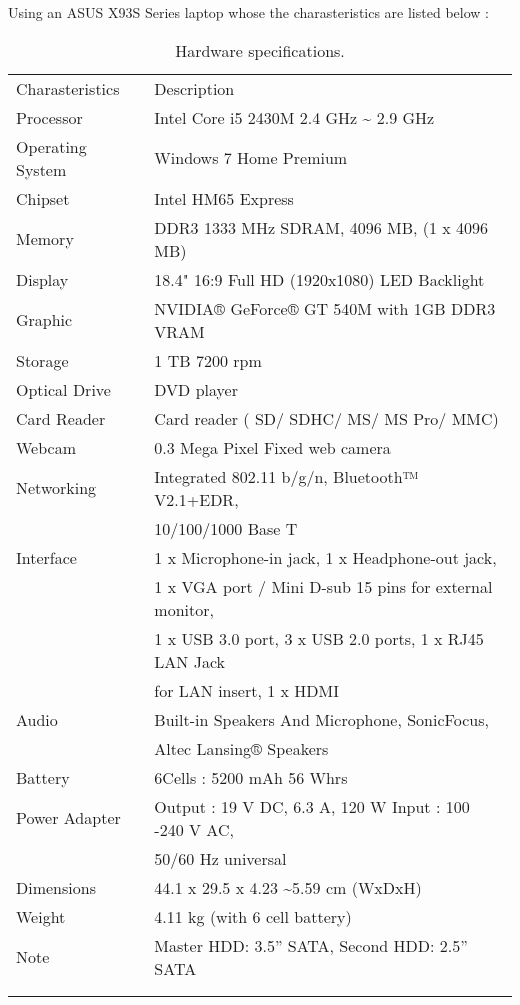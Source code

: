 \documentclass[]{article}
\begin{document}
Using an ASUS X93S Series laptop whose the charasteristics are listed
below :

\begin{longtable}[c]{@{}ll@{}}
\toprule\addlinespace
Charasteristics & Description
\\\addlinespace
\midrule\endhead
Processor & Intel Core i5 2430M 2.4 GHz \textasciitilde{} 2.9 GHz
\\\addlinespace
Operating System & Windows 7 Home Premium
\\\addlinespace
Chipset & Intel HM65 Express
\\\addlinespace
Memory & DDR3 1333 MHz SDRAM, 4096 MB, (1 x 4096 MB)
\\\addlinespace
Display & 18.4" 16:9 Full HD (1920x1080) LED Backlight
\\\addlinespace
Graphic & NVIDIA® GeForce® GT 540M with 1GB DDR3 VRAM
\\\addlinespace
Storage & 1 TB 7200 rpm
\\\addlinespace
Optical Drive & DVD player
\\\addlinespace
Card Reader & Card reader ( SD/ SDHC/ MS/ MS Pro/ MMC)
\\\addlinespace
Webcam & 0.3 Mega Pixel Fixed web camera
\\\addlinespace
Networking & Integrated 802.11 b/g/n, Bluetooth™ V2.1+EDR,
\\\addlinespace
&10/100/1000 Base T
\\\addlinespace
Interface & 1 x Microphone-in jack, 1 x Headphone-out jack,
\\\addlinespace
&
1 x VGA port
/ Mini D-sub 15 pins for external monitor,
\\\addlinespace
&  1 x USB 3.0 port, 3 x USB 2.0
ports, 1 x RJ45 LAN Jack
\\\addlinespace
& for LAN insert, 1 x HDMI
\\\addlinespace
Audio & Built-in Speakers And Microphone, SonicFocus,
\\\addlinespace
& Altec Lansing® Speakers
\\\addlinespace
Battery & 6Cells : 5200 mAh 56 Whrs
\\\addlinespace
Power Adapter & Output : 19 V DC, 6.3 A, 120 W Input : 100 -240 V AC,
\\\addlinespace
& 50/60 Hz universal
\\\addlinespace
Dimensions & 44.1 x 29.5 x 4.23 \textasciitilde{}5.59 cm (WxDxH)
\\\addlinespace
Weight & 4.11 kg (with 6 cell battery)
\\\addlinespace
Note & Master HDD: 3.5'' SATA, Second HDD: 2.5'' SATA
\\\addlinespace
\bottomrule
\\\addlinespace
\caption{Hardware specifications.}
\end{longtable}
\end{document}
